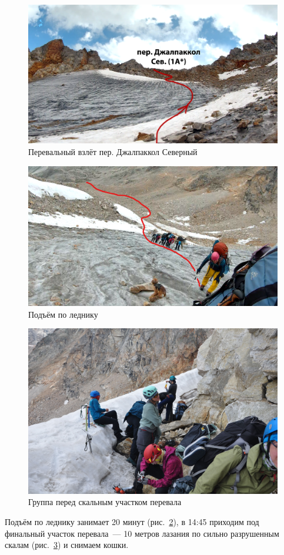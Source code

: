 \begin{figure}[h!]
	\centering
	\includegraphics[width=0.7\linewidth]{../pics/dzh_1}
	\caption{Перевальный взлёт пер. Джалпаккол Северный}
	\label{fig:dzh_1}
\end{figure}

\begin{figure}[h!]	
	\centering
	\includegraphics[angle=0, width=0.7\linewidth]{../pics/gopro_dzh}
	\caption{Подъём по леднику}
	\label{fig:gopro_dzh}
\end{figure}

\begin{figure}[h!]	
	\centering
	\includegraphics[angle=0, width=0.7\linewidth]{../pics/DSC_0021}
	\caption{Группа перед скальным участком перевала}
	\label{fig:DSC_0021}
\end{figure}


Подъём по леднику занимает 20 минут (рис.~\ref{fig:gopro_dzh}), в 14:45 приходим под финальный участок перевала~--- 10 метров лазания по сильно разрушенным скалам (рис.~\ref{fig:DSC_0021}) и снимаем кошки.




